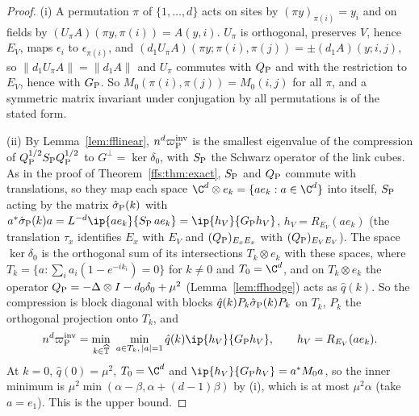 \begin{proof}
(i) A permutation $\pi$ of $\{1,\dots,d\}$ acts on sites by $(\pi y)_{\pi(i)}=
y_i$ and on fields by $(U_\pi A)(\pi y,\pi(i))=A(y,i)$. $U_\pi$ is orthogonal,
preserves $V$, hence $E_V$, maps $\epsilon_i$ to $\epsilon_{\pi(i)}$, and
$(d_1U_\pi A)(\pi y;\pi(i),\pi(j))=\pm(d_1A)(y;i,j)$, so $\lVert d_1U_\pi A
\rVert=\lVert d_1A\rVert$ and $U_\pi$ commutes with $Q_{\rm P}$ and with the
restriction to $E_V$, hence with $G_{\rm P}$. So $M_0(\pi(i),\pi(j))=M_0(i,j)$
for all $\pi$, and a symmetric matrix invariant under conjugation by all
permutations is of the stated form.

(ii) By Lemma~\ref{lem:fflinear}, $n^d\varpi_{\rm P}^{\rm inv}$ is the smallest
eigenvalue of the compression of $Q_{\rm P}^{1/2}S_{\rm P}Q_{\rm P}^{1/2}$ to
$G^\perp=\ker\delta_0$, with $S_{\rm P}$ the Schwarz operator of the link
cubes. As in the proof of Theorem~\ref{ffs:thm:exact}, $S_{\rm P}$ and $Q_{\rm
P}$ commute with translations, so they map each space $\C^d\otimes e_k=\{ae_k:
a\in\C^d\}$ into itself, $S_{\rm P}$ acting by the matrix $\hat\sigma_{\rm P}
(k)$ with $a^*\hat\sigma_{\rm P}(k)a=L^{-d}\ip{ae_k}{S_{\rm P}\,ae_k}=\ip{h_V}
{G_{\rm P}h_V}$, $h_V=R_{E_V}(ae_k)$ (the translation $\tau_x$ identifies
$E_x$ with $E_V$ and $(Q_{\rm P})_{E_xE_x}$ with $(Q_{\rm P})_{E_VE_V}$). The
space $\ker\delta_0$ is the orthogonal sum of its intersections $T_k\otimes e_k$
with these spaces, where $T_k=\{a:\sum_ia_i(1-e^{-ik_i})=0\}$ for $k\ne0$ and
$T_0=\C^d$, and on $T_k\otimes e_k$ the operator $Q_{\rm P}=-\Delta\otimes I-
d_0\delta_0+\mu^2$ (Lemma~\ref{lem:ffhodge}) acts as $\hat q(k)$. So the
compression is block diagonal with blocks $\hat q(k)P_k\hat\sigma_{\rm P}(k)
P_k$ on $T_k$, $P_k$ the orthogonal projection onto $T_k$, and
\begin{equation}\label{ffs:eq:procamin}
n^d\varpi_{\rm P}^{\rm inv}=\min_{k\in\widehat{\mathbb T}}\ \min_{a\in T_k,\,
\lvert a\rvert=1}\hat q(k)\ip{h_V}{G_{\rm P}h_V},\qquad h_V=R_{E_V}(ae_k).
\end{equation}
At $k=0$, $\hat q(0)=\mu^2$, $T_0=\C^d$ and $\ip{h_V}{G_{\rm P}h_V}=a^*M_0a$,
so the inner minimum is $\mu^2\min(\alpha-\beta,\alpha+(d-1)\beta)$ by (i),
which is at most $\mu^2\alpha$ (take $a=e_1$). This is the upper bound.


\end{proof}

